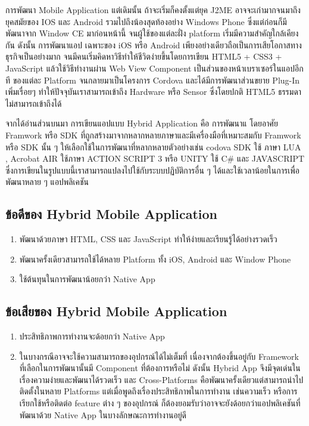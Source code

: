 การพัฒนา Mobile Application แต่เดิมนั้น ถ้าจะเริ่มก็คงตั้งแต่ยุค J2ME อาจจะเก่ามากจนมาถึงยุคสมัยของ IOS และ Android 
รวมไปถึงน้องสุดท้องอย่าง Windows Phone 
ซึ่งแต่ก่อนก็มีพัฒนาจาก Window CE มาก่อนหน้านี้ จนผู้ใช้ของแต่ละฝั่ง platform เริ่มมีความสำคัญใกล้เคียงกัน ดังนั้น การพัฒนาแอป
เฉพาะของ iOS หรือ Android เพียงอย่างเดียวถือเป็นการเสียโอกาสทางธุรกิจเป็นอย่างมาก จนมีคนเริ่มคิดหาวิธีทำให้ชีวิตง่ายขึ้นโดยการเขียน 
HTML5 + CSS3 + JavaScript แล้วใช้วิธีทำงานผ่าน Web View Component เป็นส่วนของหน้าเบราเซอร์ในแอปอีกที ของแต่ละ Platform 
จนกลายมาเป็นโครงการ Cordova และได้มีการพัฒนาส่วนขยาย Plug-In เพิ่มเรื่อยๆ ทำให้ปัจจุบันเราสามารถเข้าถึง Hardware หรือ Sensor 
ซึ่งโดยปกติ HTML5 ธรรมดาไม่สามารถเข้าถึงได้ 

จากได้อ่านส่วนบนมา การเขียนแอปแบบ Hybrid Application คือ การพัฒนาแ โดยอาศัย Framwork หรือ SDK 
ที่ถูกสร้างมาจากหลากหลายภาษาและมีเครื่องมือที่เหมาะสมกับ Framwork หรือ SDK นั้น ๆ ให้เลือกใช้ในการพัฒนาที่หลากหลายตัวอย่างเช่น 
codova SDK ใช้ ภาษา LUA , Acrobat AIR ใช้ภาษา ACTION SCRIPT 3 หรือ UNITY ใช้ C# และ JAVASCRIPT 
ซึ่งการเขียนในรูปแบบนี้เราสามารถแปลงไปใช้กับระบบปฏิบัติการอื่น ๆ ได้และใช้เวลาน้อยในการเพื่อพัฒนาหลาย ๆ แอปพลิเคชัน

	\subsection{ข้อดีของ Hybrid Mobile Application}
	\begin{enumerate}
		\item พัฒนาด้วยภาษา HTML, CSS และ JavaScript ทำให้ง่ายและเรียนรู้ได้อย่างรวดเร็ว
		\item พัฒนาครั้งเดียวสามารถใช้ได้หลาย Platform ทั้ง iOS, Android และ Window Phone
		\item ใช้ต้นทุนในการพัฒนาน้อยกว่า Native App
	\end{enumerate}

	\subsection{ข้อเสียของ Hybrid Mobile Application}
	\begin{enumerate}
		\item ประสิทธิภาพการทำงานจะด้อยกว่า Native App
		\item ในบางกรณีอาจจะใช้ความสามารถของอุปกรณ์ได้ไม่เต็มที่ เนื่องจากต้องขึ้นอยู่กับ Framework ที่เลือกในการพัฒนานั้นมี Component ที่ต้องการหรือไม่
		ดังนั้น Hybrid App จึงมีจุดเด่นในเรื่องความง่ายและพัฒนาได้รวดเร็ว และ Cross-Platforms คือพัฒนาครั้งเดียวแต่สามารถนำไปติดตั้งในหลาย Platforms แต่เมื่อพูดถึงเรื่องประสิทธิภาพในการทำงาน เช่นความเร็ว หรือการเรียกใช้หรือติดต่อ feature ต่าง ๆ ของอุปกรณ์ ก็ต้องยอมรับว่าอาจจะยังด้อยกว่าแอปพลิเคชันที่พัฒนาด้วย Native App ในบางลักษณะการทำงานอยู่ดี
	\end{enumerate}

